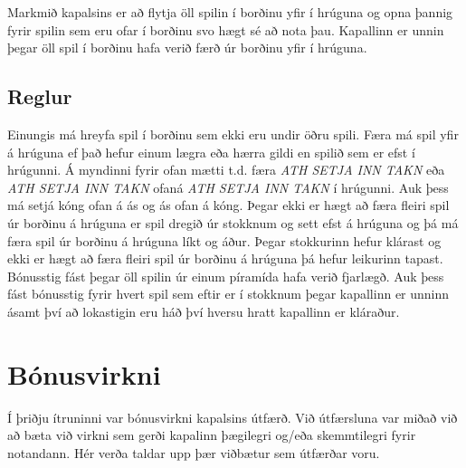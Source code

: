\documentclass[11pt,a4paper,titlepage]{article}
\theoremstyle{plain}
\theoremstyle{remark}
\begin{document}
Markmið kapalsins er að flytja öll spilin í borðinu yfir í hrúguna og opna þannig fyrir spilin sem eru ofar í borðinu svo hægt sé að nota þau. Kapallinn er unnin þegar öll spil í borðinu hafa verið færð úr borðinu yfir í hrúguna.

\subsection*{Reglur}

Einungis má hreyfa spil í borðinu sem ekki eru undir öðru spili. Færa má spil yfir á hrúguna ef það hefur einum lægra eða hærra gildi en spilið sem er efst í hrúgunni. Á myndinni fyrir ofan mætti t.d. færa \emph{ATH SETJA INN TAKN} eða \emph{ATH SETJA INN TAKN}  ofaná \emph{ATH SETJA INN TAKN}  í hrúgunni. Auk þess má setjá kóng ofan á ás og ás ofan á kóng. Þegar ekki er hægt að færa fleiri spil úr borðinu á hrúguna er spil dregið úr stokknum og sett efst á hrúguna og þá má færa spil úr borðinu á hrúguna líkt og áður. Þegar stokkurinn hefur klárast og ekki er hægt að færa fleiri spil úr borðinu á hrúguna þá hefur leikurinn tapast. Bónusstig fást þegar öll spilin úr einum píramída hafa verið fjarlægð. Auk þess fást bónusstig fyrir hvert spil sem eftir er í stokknum þegar kapallinn er unninn ásamt því að lokastigin eru háð því hversu hratt kapallinn er kláraður.


\section{Bónusvirkni}

Í þriðju ítruninni var bónusvirkni kapalsins útfærð. Við útfærsluna var miðað við að bæta við virkni sem gerði kapalinn þægilegri og/eða skemmtilegri fyrir notandann. Hér verða taldar upp þær viðbætur sem útfærðar voru.
\end{document}
